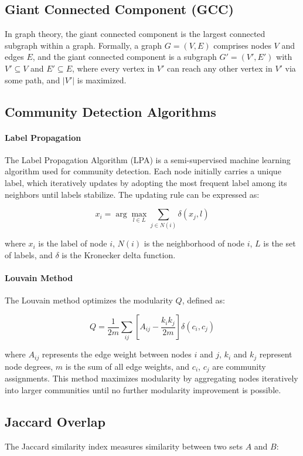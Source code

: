 \documentclass{article}
\begin{document}
\subsection{Giant Connected Component (GCC)}
In graph theory, the giant connected component is the largest connected subgraph within a graph. Formally, a graph $G = (V, E)$ comprises nodes $V$ and edges $E$, and the giant connected component is a subgraph $G' = (V', E')$ with $V' \subseteq V$ and $E' \subseteq E$, where every vertex in $V'$ can reach any other vertex in $V'$ via some path, and $|V'|$ is maximized.

\subsection{Community Detection Algorithms}

\paragraph{Label Propagation}
The Label Propagation Algorithm (LPA) is a semi-supervised machine learning algorithm used for community detection. Each node initially carries a unique label, which iteratively updates by adopting the most frequent label among its neighbors until labels stabilize. The updating rule can be expressed as:

$$
x_i = \arg\max_{l \in L} \sum_{j \in N(i)} \delta(x_j, l)
$$

where $x_i$ is the label of node $i$, $N(i)$ is the neighborhood of node $i$, $L$ is the set of labels, and $\delta$ is the Kronecker delta function.

\paragraph{Louvain Method}
The Louvain method optimizes the modularity $Q$, defined as:

$$
Q = \frac{1}{2m} \sum_{ij}\left[A_{ij} - \frac{k_i k_j}{2m}\right]\delta(c_i, c_j)
$$

where $A_{ij}$ represents the edge weight between nodes $i$ and $j$, $k_i$ and $k_j$ represent node degrees, $m$ is the sum of all edge weights, and $c_i$, $c_j$ are community assignments. This method maximizes modularity by aggregating nodes iteratively into larger communities until no further modularity improvement is possible.


\subsection{Jaccard Overlap}
The Jaccard similarity index measures similarity between two sets $A$ and $B$:
\end{document}
